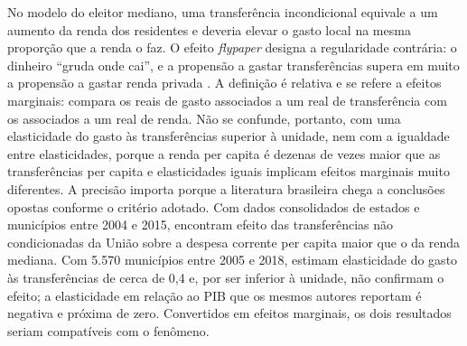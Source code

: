 No modelo do eleitor mediano, uma transferência incondicional equivale a um aumento da renda dos residentes e deveria elevar o gasto local na mesma proporção que a renda o faz. O efeito \textit{flypaper} designa a regularidade contrária: o dinheiro ``gruda onde cai'', e a propensão a gastar transferências supera em muito a propensão a gastar renda privada \citep{HinesThaler1995}. A definição é relativa e se refere a efeitos marginais: compara os reais de gasto associados a um real de transferência com os associados a um real de renda. Não se confunde, portanto, com uma elasticidade do gasto às transferências superior à unidade, nem com a igualdade entre elasticidades, porque a renda per capita é dezenas de vezes maior que as transferências per capita e elasticidades iguais implicam efeitos marginais muito diferentes. A precisão importa porque a literatura brasileira chega a conclusões opostas conforme o critério adotado. Com dados consolidados de estados e municípios entre 2004 e 2015, \citet{Pansani2020} encontram efeito das transferências não condicionadas da União sobre a despesa corrente per capita maior que o da renda mediana. Com 5.570 municípios entre 2005 e 2018, \citet{Paz2020} estimam elasticidade do gasto às transferências de cerca de 0,4 e, por ser inferior à unidade, não confirmam o efeito; a elasticidade em relação ao PIB que os mesmos autores reportam é negativa e próxima de zero. Convertidos em efeitos marginais, os dois resultados seriam compatíveis com o fenômeno.

